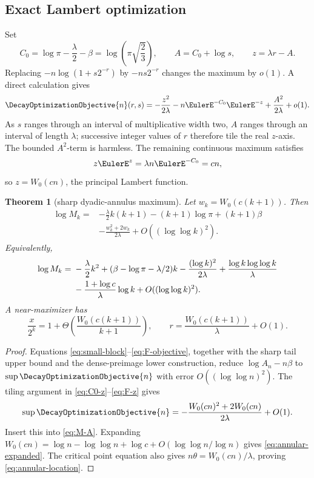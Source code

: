 \documentclass[11pt,oneside]{article}
\newtheorem{theorem}{Theorem}[section]
\theoremstyle{definition}
\theoremstyle{remark}
\newcommand{\Wlam}{W_0}
\begin{document}
\subsection{Exact Lambert optimization}

Set
\begin{equation}
 C_0=\log\pi-\frac\lambda2-\beta
 =\log\!\left(\pi\sqrt{\frac23}\right),
 \qquad A=C_0+\log s,
 \qquad z=\lambda r-A.
 \label{eq:C0-z}
\end{equation}
Replacing \(-n\log(1+s2^{-r})\) by \(-ns2^{-r}\) changes the maximum by
\(o(1)\).  A direct calculation gives
\begin{equation}
 \DecayOptimizationObjective{n}(r,s)
 =-\frac{z^2}{2\lambda}-n\EulerE^{-C_0}\EulerE^{-z}
 +\frac{A^2}{2\lambda}+o(1).
 \label{eq:F-z}
\end{equation}
As \(s\) ranges through an interval of multiplicative width two, \(A\) ranges
through an interval of length \(\lambda\); successive integer values of \(r\)
therefore tile the real \(z\)-axis.  The bounded \(A^2\)-term is harmless.
The remaining continuous maximum satisfies
\[
 z\EulerE^z=\lambda n\EulerE^{-C_0}=cn,
\]
so \(z=\Wlam(cn)\), the principal Lambert function.

\begin{theorem}[sharp dyadic-annulus maximum]
\label{thm:annular-max}
Let \(w_k=\Wlam(c(k+1))\).  Then
\begin{equation}
 \boxed{
 \begin{aligned}
 \log M_k={}&-\frac\lambda2k(k+1)-(k+1)\log\pi+(k+1)\beta\\
 &-\frac{w_k^2+2w_k}{2\lambda}
 +O((\log\log k)^2).
 \end{aligned}}
 \label{eq:annular-main}
\end{equation}
Equivalently,
\begin{align}
 \log M_k={}&-\frac\lambda2k^2
 +(\beta-\log\pi-\lambda/2)k
 -\frac{(\log k)^2}{2\lambda}
 +\frac{\log k\log\log k}{\lambda}
 \notag\\
 &-\frac{1+\log c}{\lambda}\log k
 +O((\log\log k)^2).
 \label{eq:annular-expanded}
\end{align}
A near-maximizer has
\begin{equation}
 \frac{x}{2^k}=1+\Theta\!\left(\frac{\Wlam(c(k+1))}{k+1}\right),
 \qquad
 r=\frac{\Wlam(c(k+1))}{\lambda}+O(1).
 \label{eq:annular-location}
\end{equation}
\end{theorem}

\begin{proof}
Equations \eqref{eq:small-block}--\eqref{eq:F-objective}, together with the
sharp tail upper bound and the dense-preimage lower construction, reduce
\(\log A_n-n\beta\) to \(\sup\DecayOptimizationObjective{n}\) with error
\(O((\log\log n)^2)\).  The tiling argument in
\eqref{eq:C0-z}--\eqref{eq:F-z} gives
\[
 \sup\DecayOptimizationObjective{n}
 =-\frac{\Wlam(cn)^2+2\Wlam(cn)}{2\lambda}+O(1).
\]
Insert this into \eqref{eq:M-A}.  Expanding
\(\Wlam(cn)=\log n-\log\log n+\log c+
O(\log\log n/\log n)\) gives \eqref{eq:annular-expanded}.  The critical
point equation also gives
\(n\theta=\Wlam(cn)/\lambda\), proving
\eqref{eq:annular-location}.
\end{proof}
\end{document}
